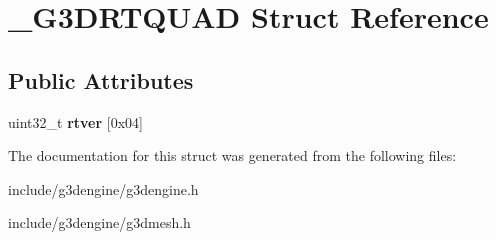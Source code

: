 \hypertarget{struct__G3DRTQUAD}{}\section{\+\_\+\+G3\+D\+R\+T\+Q\+U\+AD Struct Reference}
\label{struct__G3DRTQUAD}
\subsection*{Public Attributes}
\begin{DoxyCompactItemize}
\item 
\mbox{\label{struct__G3DRTQUAD_afb9eb77ed10321a696de9d6166023feb}} 
uint32\+\_\+t {\bfseries rtver} \mbox{[}0x04\mbox{]}
\end{DoxyCompactItemize}


The documentation for this struct was generated from the following files\+:\begin{DoxyCompactItemize}
\item 
include/g3dengine/g3dengine.\+h\item 
include/g3dengine/g3dmesh.\+h\end{DoxyCompactItemize}
